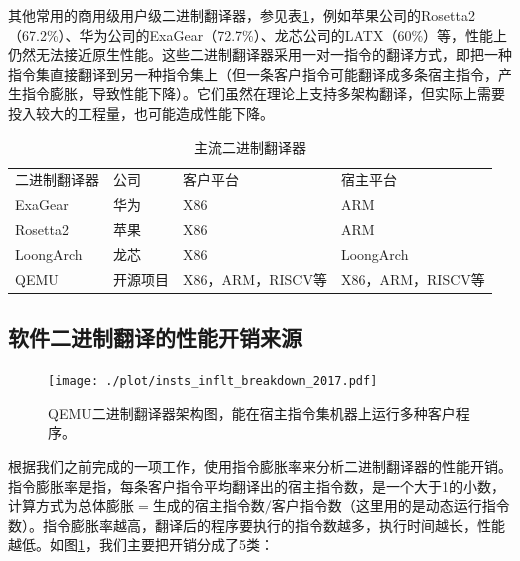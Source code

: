 \documentclass{Style/ucasproposal}%
\begin{document}
其他常用的商用级用户级二进制翻译器，参见表\ref{tab:BTs}，例如苹果公司的Rosetta2（67.2\%）、华为公司的ExaGear（72.7\%）、龙芯公司的LATX（60\%）等，性能上仍然无法接近原生性能。这些二进制翻译器采用一对一指令的翻译方式，即把一种指令集直接翻译到另一种指令集上（但一条客户指令可能翻译成多条宿主指令，产生指令膨胀，导致性能下降）。它们虽然在理论上支持多架构翻译，但实际上需要投入较大的工程量，也可能造成性能下降。

\begin{table}[]
\centering
\caption{主流二进制翻译器}
\label{tab:BTs}
  \begin{tabular}{llll}
  \rowcolor[HTML]{FBE5D6} 
  二进制翻译器    & 公司   & 客户平台           & 宿主平台           \\
  ExaGear   & 华为   & X86            & ARM            \\
  Rosetta2  & 苹果   & X86            & ARM            \\
  LoongArch & 龙芯   & X86            & LoongArch      \\
  QEMU      & 开源项目 & X86，ARM，RISCV等 & X86，ARM，RISCV等
  \end{tabular}
  \end{table}

\subsection{软件二进制翻译的性能开销来源}

\begin{figure}[h]
  \centering
  \texttt{[image: ./plot/insts\_inflt\_breakdown\_2017.pdf]}
  \caption{QEMU二进制翻译器架构图，能在宿主指令集机器上运行多种客户程序。}
  \label{img:insts_inflt_breakdown_2017}
\end{figure}

根据我们之前完成的一项工作，使用指令膨胀率来分析二进制翻译器的性能开销。指令膨胀率是指，每条客户指令平均翻译出的宿主指令数，是一个大于1的小数，计算方式为$\mbox{总体膨胀} = \mbox{生成的宿主指令数} / \mbox{客户指令数}$（这里用的是动态运行指令数）。指令膨胀率越高，翻译后的程序要执行的指令数越多，执行时间越长，性能越低。如图\ref{img:insts_inflt_breakdown_2017}，我们主要把开销分成了5类：
\end{document}
